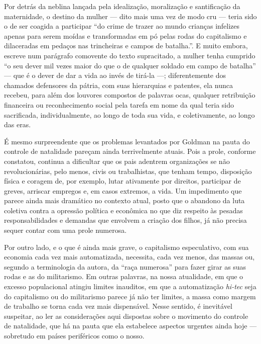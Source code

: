 Por detrás da neblina
lançada pela idealização, moralização e santificação da maternidade, o
destino da mulher --- dito mais uma vez de modo cru --- teria sido o de
ser coagida a participar ``do crime de trazer ao mundo crianças
infelizes apenas para serem moídas e transformadas em pó pelas rodas do
capitalismo e dilaceradas em pedaços nas trincheiras e campos de
batalha.''. E muito embora, escreve num parágrafo comovente do texto
supracitado, a mulher tenha cumprido ``o seu dever mil vezes maior do
que o de qualquer soldado em campo de batalha'' --- que é o dever de dar
a vida ao invés de tirá-la ---; diferentemente dos chamados defensores da
pátria, com suas hierarquias e patentes, ela nunca recebeu, para além
dos louvores compostos de palavras ocas, qualquer retribuição financeira
ou reconhecimento social pela tarefa em nome da qual teria sido
sacrificada, individualmente, ao longo de toda sua vida, e
coletivamente, ao longo das eras.

É mesmo surpreendente que os problemas levantados por Goldman na pauta
do controle de natalidade pareçam ainda terrivelmente atuais. Pois a
prole, conforme constatou, continua a dificultar que os pais
adentrem organizações se não revolucionárias, pelo menos, civis ou
trabalhistas, que tenham tempo, disposição física e coragem de, por
exemplo, lutar ativamente por direitos, participar de greves, arriscar
empregos e, em casos extremos, a vida. Um impedimento que parece ainda
mais dramático no contexto atual, posto que o abandono da luta coletiva
contra a opressão política e econômica no que diz respeito às pesadas
responsabilidades e demandas que envolvem a criação dos filhos, já não
precisa sequer contar com uma prole numerosa. 

Por outro lado, e o que é
ainda mais grave, o capitalismo especulativo, com sua economia cada vez
mais automatizada, necessita, cada vez menos, das massas ou, segundo a
terminologia da autora, da ``raça numerosa'' para fazer girar as suas
rodas e as do militarismo. Em outras palavras, na nossa atualidade, em
que o excesso populacional atingiu limites inauditos, em que a
automatização \textit{hi-tec} seja do capitalismo ou do militarismo parece
já não ter limites, a massa como margem de trabalho se torna cada vez
mais dispensável. Nesse sentido, é inevitável suspeitar, ao ler as
considerações aqui dispostas sobre o movimento do controle de
natalidade, que há na pauta que ela estabelece aspectos urgentes ainda
hoje --- sobretudo em países periféricos como o nosso. 


